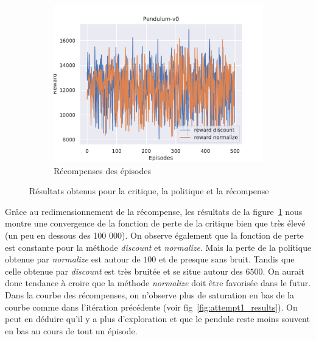 \begin{figure}[H]
\begin{subfigure}{0.3\textwidth}
    \end{subfigure}
    \begin{subfigure}{0.3\textwidth}
        \includegraphics[width=\textwidth]{figures/iteration2/rewards_Pendulum-v0_pg_dataset_td_eval_True_cycles_500_trajs_20_batches_20_gamma_0.99_nstep_5_lr_act_0.01_lr_critic_0.01.pdf}
        \caption{Récompenses des épisodes}
    \end{subfigure}
    \caption{Résultats obtenus pour la critique, la politique et la récompense}
    \label{fig:itr2_results}
\end{figure}

Grâce au redimensionnement de la récompense, les résultats de la figure~\ref{fig:itr2_results} nous montre une convergence de la fonction de perte de la critique bien que très élevé (un peu en dessous des 100 000). On observe également que la fonction de perte est constante pour la méthode \emph{discount} et \emph{normalize}. Mais la perte de la politique obtenue par \emph{normalize} est autour de $100$ et de presque sans bruit. Tandis que celle obtenue par \emph{discount} est très bruitée et se situe autour des $6500$. On aurait donc tendance à croire que la méthode \emph{normalize} doit être favorisée dans le futur. Dans la courbe des récompenses, on n'observe plus de saturation en bas de la courbe comme dans l'itération précédente (voir fig~\ref{fig:attempt1_results}). On peut en déduire qu'il y a plus d'exploration et que le pendule reste moins souvent en bas au cours de tout un épisode.


